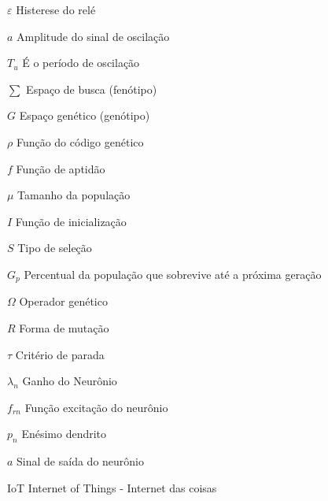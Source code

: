 \begin{simbolos}
  \item[$\varepsilon$] Histerese do relé
  \item[$a$] Amplitude do sinal de oscilação
  \item[$T_u$] É o período de oscilação
  \item[$\sum$] Espaço de busca (fenótipo)
  \item[$G$] Espaço genético (genótipo)
  \item[$\rho$] Função do código genético
  \item[$f$] Função de aptidão
  \item[$\mu$] Tamanho da população
  \item[$I$] Função de inicialização
  \item[$S$] Tipo de seleção
  \item[$G_p$] Percentual da população que sobrevive até a próxima geração
  \item[$\Omega$] Operador genético
  \item[$R$] Forma de mutação
  \item[$\tau$] Critério de parada
  \item[$\lambda_n$] Ganho do Neurônio
  \item[$f_{rn}$] Função excitação do neurônio
  \item[$p_n$] Enésimo dendrito
  \item[$a$] Sinal de saída do neurônio
  \item[IoT] Internet of Things - Internet das coisas
\end{simbolos}